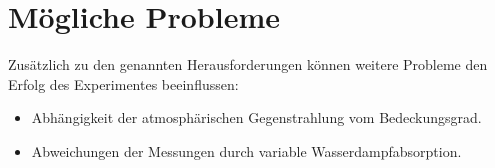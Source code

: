 \documentclass[a4paper,fleqn]{article}
\numberwithin{equation}{section}
\numberwithin{figure}{section}
\numberwithin{table}{section}
\begin{document}
\section{Mögliche Probleme}\label{sec:probleme}
Zusätzlich zu den genannten Herausforderungen können weitere Probleme den
Erfolg des Experimentes beeinflussen:
\begin{itemize}
  \item Abhängigkeit der atmosphärischen Gegenstrahlung vom Bedeckungsgrad.
  \item Abweichungen der Messungen durch variable Wasserdampfabsorption.
\end{itemize}

%
\end{document}
